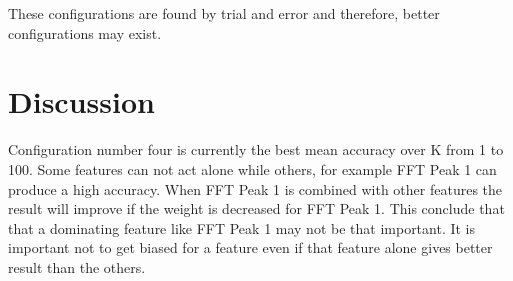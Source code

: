 These configurations are found by trial and error and therefore, better configurations may exist.

\section{Discussion}
Configuration number four is currently the best mean accuracy over K from 1 to 100.
Some features can not act alone while others, for example FFT Peak 1 can produce a high accuracy.
When FFT Peak 1 is combined with other features the result will improve if the
weight is decreased for FFT Peak 1. This conclude that that a dominating feature
like FFT Peak 1 may not be that important. It is important not to get biased for
a feature even if that feature alone gives better result than the others.
